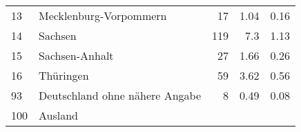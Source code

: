 \begin{longtable}{lXrrr}
     13 &
     \multicolumn{1}{X}{ Mecklenburg-Vorpommern   } &


       \num{17} &
       \num[round-mode=places,round-precision=2]{1.04} &
         \num[round-mode=places,round-precision=2]{0.16} \\

     14 &
     \multicolumn{1}{X}{ Sachsen   } &


       \num{119} &
       \num[round-mode=places,round-precision=2]{7.3} &
         \num[round-mode=places,round-precision=2]{1.13} \\

     15 &
     \multicolumn{1}{X}{ Sachsen-Anhalt   } &


       \num{27} &
       \num[round-mode=places,round-precision=2]{1.66} &
         \num[round-mode=places,round-precision=2]{0.26} \\

     16 &
     \multicolumn{1}{X}{ Thüringen   } &


       \num{59} &
       \num[round-mode=places,round-precision=2]{3.62} &
         \num[round-mode=places,round-precision=2]{0.56} \\

     93 &
     \multicolumn{1}{X}{ Deutschland ohne nähere Angabe   } &


       \num{8} &
       \num[round-mode=places,round-precision=2]{0.49} &
         \num[round-mode=places,round-precision=2]{0.08} \\

     100 &
     \multicolumn{1}{X}{ Ausland   } &



\end{longtable}
